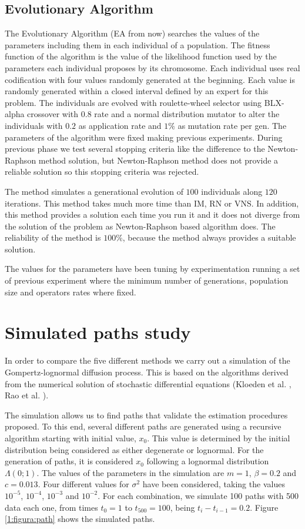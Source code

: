 \documentclass{sig-alternate}
\begin{document}
\subsection{Evolutionary Algorithm}
\label{subsec:EA}
The Evolutionary Algorithm (EA from now) \cite{EA} searches the values of the parameters including them in each individual of a population. The fitness function of the algorithm is the value of the likelihood function used by the parameters each individual proposes by its chromosome. Each individual uses real codification with four values randomly generated at the beginning. Each value is randomly generated within a closed interval defined by an expert for this problem. The individuals are evolved with roulette-wheel selector using BLX-alpha crossover \cite{blx} with $0.8$ rate and a normal distribution mutator to alter the individuals with $0.2$ as application rate and $1\%$ as mutation rate per gen. The parameters of the algorithm were fixed making previous experiments. During previous phase we test several stopping criteria like the difference to the Newton-Raphson method solution, but Newton-Raphson method does not provide a reliable solution so this stopping criteria was rejected.

The method simulates a generational evolution of $100$ individuals along $120$ iterations. This method takes much more time than IM, RN or VNS. In addition, this method provides a solution each time you run it and it does not diverge from the solution of the problem as Newton-Raphson based algorithm does. The reliability of the method is $100\%$, because the method always provides a suitable solution.

The values for the parameters have been tuning by experimentation running a set of previous experiment where the minimum number of generations, population size and operators rates where fixed.


\section{Simulated paths study}
\label{sec:pathsStudy}
In order to compare the five different methods we carry out a simulation of the Gompertz-lognormal diffusion process. This is based on the algorithms derived from the numerical solution of stochastic differential equations (Kloeden et al. \cite{Kloeden}, Rao et al. \cite{Rao}).

The simulation allows us to find paths that validate the estimation procedures proposed. To this end, several different paths are generated using a recursive algorithm starting with initial value, $x_0$. This value is determined by the initial distribution being considered as either degenerate or lognormal. For the generation of paths, it is considered $x_0$ following a lognormal distribution $\Lambda(0;1)$. The values of the parameters in the simulation are $m=1$, $\beta=0.2$ and $c=0.013$. Four different values for $\sigma^2$ have been considered, taking the values $10^{-5}$, $10^{-4}$, $10^{-3}$ and $10^{-2}$. For each combination, we simulate 100 paths with 500 data each one, from times $t_0=1$ to $t_{500}=100$, being $t_i-t_{i-1}=0.2$. Figure \ref{1:figura:path} shows the simulated paths.
\end{document}
